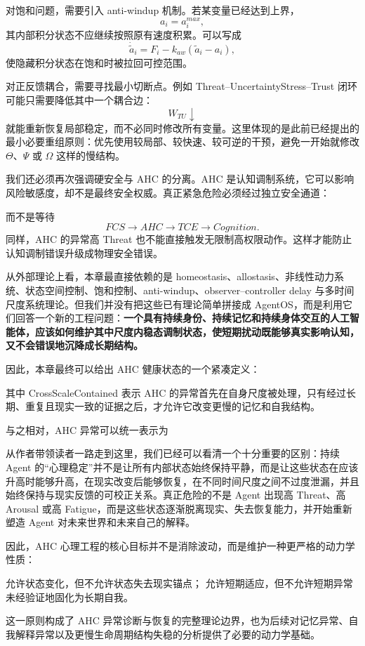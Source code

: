 对饱和问题，需要引入 anti-windup 机制。若某变量已经达到上界，
\[
a_i=a_i^{max},
\]
其内部积分状态不应继续按照原有速度积累。可以写成
\[
\dot{\tilde a}_i
=
F_i
-
k_{aw}
\left(
\tilde a_i-a_i
\right),
\]
使隐藏积分状态在饱和时被拉回可控范围。

对正反馈耦合，需要寻找最小切断点。例如 Threat--UncertaintyStress--Trust 闭环可能只需要降低其中一个耦合边：
\[
W_{TU}\downarrow
\]
就能重新恢复局部稳定，而不必同时修改所有变量。这里体现的是此前已经提出的最小必要重组原则：优先使用较局部、较快速、较可逆的干预，避免一开始就修改 $\Theta$、$\Psi$ 或 $\Omega$ 这样的慢结构。

我们还必须再次强调硬安全与 AHC 的分离。AHC 是认知调制系统，它可以影响风险敏感度，却不是最终安全权威。真正紧急危险必须经过独立安全通道：
\begin{statementbox}
\centering
{}
\end{statementbox}
而不是等待
\[
FCS\rightarrow AHC\rightarrow TCE\rightarrow Cognition.
\]
同样，AHC 的异常高 Threat 也不能直接触发无限制高权限动作。这样才能防止认知调制错误升级成物理安全错误。

从外部理论上看，本章最直接依赖的是 homeostasis、allostasis、非线性动力系统、状态空间控制、饱和控制、anti-windup、observer--controller delay 与多时间尺度系统理论。但我们并没有把这些已有理论简单拼接成 AgentOS，而是利用它们回答一个新的工程问题：\textbf{一个具有持续身份、持续记忆和持续身体交互的人工智能体，应该如何维护其中尺度内稳态调制状态，使短期扰动既能够真实影响认知，又不会错误地沉降成长期结构。}

因此，本章最终可以给出 AHC 健康状态的一个紧凑定义：
\begin{statementbox}
\centering
{}
\end{statementbox}
其中 CrossScaleContained 表示 AHC 的异常首先在自身尺度被处理，只有经过长期、重复且现实一致的证据之后，才允许它改变更慢的记忆和自我结构。

与之相对，AHC 异常可以统一表示为
\begin{statementbox}
\centering
{}
\end{statementbox}

从作者带领读者一路走到这里，我们已经可以看清一个十分重要的区别：持续 Agent 的“心理稳定”并不是让所有内部状态始终保持平静，而是让这些状态在应该升高时能够升高，在现实改变后能够恢复，在不同时间尺度之间不过度泄漏，并且始终保持与现实反馈的可校正关系。真正危险的不是 Agent 出现高 Threat、高 Arousal 或高 Fatigue，而是这些状态逐渐脱离现实、失去恢复能力，并开始重新塑造 Agent 对未来世界和未来自己的解释。

因此，AHC 心理工程的核心目标并不是消除波动，而是维护一种更严格的动力学性质：
\begin{statementbox}
允许状态变化，但不允许状态失去现实锚点；
允许短期适应，但不允许短期异常未经验证地固化为长期自我。
\end{statementbox}

这一原则构成了 AHC 异常诊断与恢复的完整理论边界，也为后续对记忆异常、自我解释异常以及更慢生命周期结构失稳的分析提供了必要的动力学基础。
